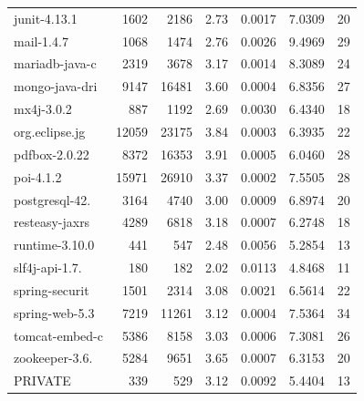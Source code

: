 \documentclass[12pt, a4paper]{article}
\begin{document}
\begin{longtable}[H]{l r r r r r r}
        junit-4.13.1   &  1602 &  2186 & 2.73 & 0.0017 & 7.0309 & 20 \\ 
        mail-1.4.7     &  1068 &  1474 & 2.76 & 0.0026 & 9.4969 & 29 \\ 
        mariadb-java-c &  2319 &  3678 & 3.17 & 0.0014 & 8.3089 & 24 \\ 
        mongo-java-dri &  9147 & 16481 & 3.60 & 0.0004 & 6.8356 & 27 \\ 
        mx4j-3.0.2     &   887 &  1192 & 2.69 & 0.0030 & 6.4340 & 18 \\ 
        org.eclipse.jg & 12059 & 23175 & 3.84 & 0.0003 & 6.3935 & 22 \\ 
        pdfbox-2.0.22  &  8372 & 16353 & 3.91 & 0.0005 & 6.0460 & 28 \\ 
        poi-4.1.2      & 15971 & 26910 & 3.37 & 0.0002 & 7.5505 & 28 \\ 
        postgresql-42. &  3164 &  4740 & 3.00 & 0.0009 & 6.8974 & 20 \\ 
        resteasy-jaxrs &  4289 &  6818 & 3.18 & 0.0007 & 6.2748 & 18 \\ 
        runtime-3.10.0 &   441 &   547 & 2.48 & 0.0056 & 5.2854 & 13 \\ 
        slf4j-api-1.7. &   180 &   182 & 2.02 & 0.0113 & 4.8468 & 11 \\ 
        spring-securit &  1501 &  2314 & 3.08 & 0.0021 & 6.5614 & 22 \\ 
        spring-web-5.3 &  7219 & 11261 & 3.12 & 0.0004 & 7.5364 & 34 \\ 
        tomcat-embed-c &  5386 &  8158 & 3.03 & 0.0006 & 7.3081 & 26 \\ 
        zookeeper-3.6. &  5284 &  9651 & 3.65 & 0.0007 & 6.3153 & 20 \\ 
        PRIVATE        &   339 &   529 & 3.12 & 0.0092 & 5.4404 & 13
\end{longtable}
\end{document}
